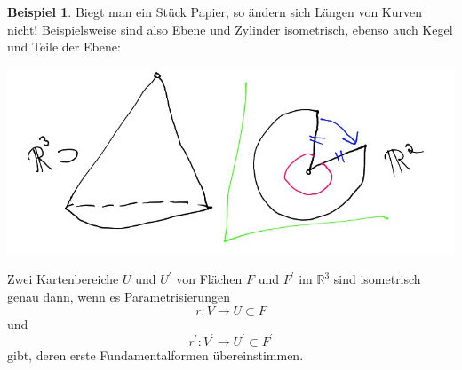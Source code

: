 \documentclass[a4paper,11pt,notitlepage]{report}
\theoremstyle{definition}
\newtheorem{example}{Beispiel}[chapter]
\newcommand{\R}{{\ensuremath{\mathbb{R}}}}
\begin{document}
\begin{example}
	Biegt man ein Stück Papier, so ändern sich Längen von Kurven nicht! Beispielsweise sind also Ebene und Zylinder isometrisch, ebenso auch Kegel und Teile der Ebene:
	\begin{center}
		\includegraphics[scale=0.4]{images/2012_01_24_Bild6.jpg}
	\end{center}
\end{example}

\begin{theorem}
	Zwei Kartenbereiche $U$ und $U^\prime$ von Flächen $F$ und $F^\prime$ im $\R^3$ sind isometrisch genau dann, wenn es Parametrisierungen
	$$r \colon V \rightarrow U \subset F$$ und $$r^\prime \colon V^\prime \rightarrow U^\prime \subset F^\prime$$ gibt, deren erste Fundamentalformen übereinstimmen.
\end{theorem}
\end{document}
